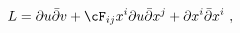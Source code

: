 \begin{equation}
 L = \partial u \bar{\partial} v + \cF_{ij} x^i \partial u \bar{\partial} x^j
   + \partial x^i \bar{\partial} x^i ~,
\end{equation}


